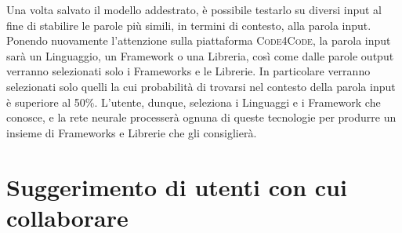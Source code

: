 Una volta salvato il modello addestrato, è possibile testarlo su diversi input al fine di stabilire le parole più simili, in termini di contesto, alla parola input. Ponendo nuovamente l'attenzione sulla piattaforma \textsc{Code4Code}, la parola input sarà un Linguaggio, un Framework o una Libreria, così come dalle parole output verranno selezionati solo i Frameworks e le Librerie. In particolare verranno selezionati solo quelli la cui probabilità di trovarsi nel contesto della parola input è superiore al 50\%. L'utente, dunque, seleziona i Linguaggi e i Framework che conosce, e la rete neurale processerà ognuna di queste tecnologie per produrre un insieme di Frameworks e Librerie che gli consiglierà.
\section{Suggerimento di utenti con cui collaborare}
